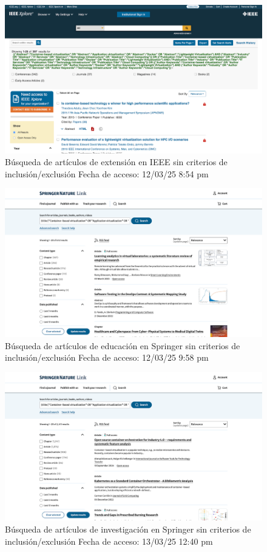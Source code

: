 \FloatBarrier\begin{figure}[H]
	\centering
	\includegraphics[width=\textwidth,keepaspectratio]{apendices/BD/sin-criterios/IEEE-ind.png}
	\caption{Búsqueda de artículos de extensión en IEEE sin criterios de inclusión/exclusión
		Fecha de acceso: 12/03/25 8:54 pm
	}\label{fig:busqueda6}
\end{figure}
\FloatBarrier\begin{figure}[H]
	\centering
	\includegraphics[width=\textwidth,keepaspectratio]{apendices/BD/sin-criterios/Springer-ed.png}
	\caption{Búsqueda de artículos de educación en Springer sin criterios de inclusión/exclusión
		Fecha de acceso: 12/03/25 9:58 pm
	}\label{fig:busqueda7}
\end{figure}
\FloatBarrier\begin{figure}[H]
	\centering
	\includegraphics[width=\textwidth,keepaspectratio]{apendices/BD/sin-criterios/Springer-inv.png}
	\caption{Búsqueda de artículos de investigación en Springer sin criterios de inclusión/exclusión
		Fecha de acceso: 13/03/25 12:40 pm
	}\label{fig:busqueda8}
\end{figure}
